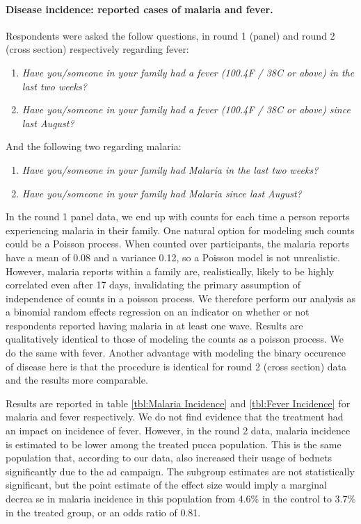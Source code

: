 \documentclass[a4paper,12pt]{article}
\begin{document}
\paragraph{Disease incidence: reported cases of malaria and fever.} Respondents were asked the follow questions, in round 1 (panel) and round 2 (cross section) respectively regarding fever:
\begin{enumerate}
\item \textit{Have you/someone in your family had a fever (100.4F / 38C or above) in the last two weeks?}
\item \textit{Have you/someone in your family had a fever (100.4F / 38C or above) since last August?}
\end{enumerate}

\noindent And the following two regarding malaria:
\begin{enumerate}
\item \textit{Have you/someone in your family had Malaria in the last two weeks?}
\item \textit{Have you/someone in your family had Malaria since last August?}
\end{enumerate}

In the round 1 panel data, we end up with counts for each time a person reports experiencing malaria in their family. One natural option for modeling such counts could be a Poisson process. When counted over participants, the malaria reports have a mean of 0.08 and a variance 0.12, so a Poisson model is not unrealistic. However, malaria reports within a family are, realistically, likely to be highly correlated even after 17 days, invalidating the primary assumption of independence of counts in a poisson process. We therefore perform our analysis as a binomial random effects regression on an indicator on whether or not respondents reported having malaria in at least one wave. Results are qualitatively identical to those of modeling the counts as a poisson process. We do the same with fever. Another advantage with modeling the binary occurence of disease here is that the procedure is identical for round 2 (cross section) data and the results more comparable.

Results are reported in table \ref{tbl:Malaria Incidence} and \ref{tbl:Fever Incidence} for malaria and fever respectively. We do not find evidence that the treatment had an impact on incidence of fever. However, in the round 2 data, malaria incidence is estimated to be lower among the treated pucca population. This is the same population that, according to our data, also increased their usage of bednets significantly due to the ad campaign. The subgroup estimates are not statistically significant, but the point estimate of the effect size would imply a marginal decrea
se in malaria incidence in this population from 4.6\% in the control to 3.7\% in the treated group, or an odds ratio of 0.81.
\end{document}
